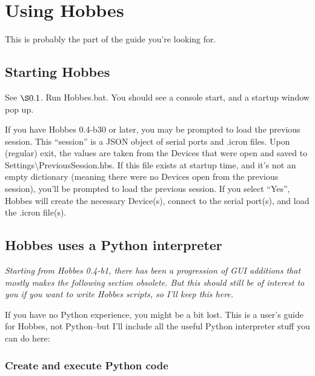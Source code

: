 %
%
\section{Using Hobbes}
\label{3}

This is probably the part of the guide you're looking for.

\setcounter{subsection}{-1}



%
%
\subsection{Starting Hobbes}
\label{3.0}

See \hyperref[0.1]{$\S0.1$}. Run Hobbes.bat. You should see a console start, and a startup window pop up.

If you have Hobbes 0.4-b30 or later, you may be prompted to load the previous session. This ``session'' is a JSON object of serial ports and .icron files. Upon (regular) exit, the values are taken from the Devices that were open and saved to Settings\textbackslash PreviousSession.hbs. If this file exists at startup time, and it's not an empty dictionary (meaning there were no Devices open from the previous session), you'll be prompted to load the previous session. If you select ``Yes'', Hobbes will create the necessary Device(s), connect to the serial port(s), and load the .icron file(s).



%
%
\subsection{Hobbes uses a Python interpreter}
\label{3.1}

\emph{Starting from Hobbes 0.4-b1, there has been a progression of GUI additions that mostly makes the following section obsolete. But this should still be of interest to you if you want to write Hobbes scripts, so I'll keep this here.}

If you have no Python experience, you might be a bit lost. This is a user's guide for Hobbes, not Python--but I'll include all the useful Python interpreter stuff you can do here:

\setcounter{subsubsection}{-1}



%
%
\subsubsection{Create and execute Python code}
\label{3.1.0}

